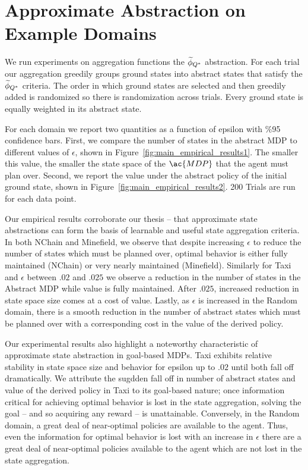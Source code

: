 \section{Approximate Abstraction on Example Domains}
We run experiments on aggregation functions the $\widetilde \phi_{Q^*}$ abstraction. For each trial our aggregation greedily groups ground states into abstract states that satisfy the $\widetilde \phi_{Q^*}$ criteria. The order in which ground states are selected and then greedily added is randomized so there is randomization across trials. Every ground state is equally weighted in its abstract state.

For each domain we report two quantities as a function of epsilon with \%95 confidence bars. First, we compare the number of states in the abstract \ac{MDP} to different values of $\epsilon$, shown in Figure~\ref{fig:main_empirical_results1}. The smaller this value, the smaller the state space of the $\ac{MDP}$ that the agent must plan over. Second, we report the value under the abstract policy of the initial ground state, shown in Figure~\ref{fig:main_empirical_results2}. 200 Trials are run for each data point.

Our empirical results corroborate our thesis -- that approximate state abstractions can form the basis of learnable and useful state aggregation criteria. In both NChain and Minefield, we observe that despite increasing $\epsilon$ to reduce the number of states which must be planned over, optimal behavior is either fully maintained (NChain) or very nearly maintained (Minefield). Similarly for Taxi and $\epsilon$ between $.02$ and $.025$ we observe a reduction in the number of states in the Abstract MDP while value is fully maintained. After $.025$, increased reduction in state space size comes at a cost of value. Lastly, as $\epsilon$ is increased in the Random domain, there is a smooth reduction in the number of abstract states which must be planned over with a corresponding cost in the value of the derived policy.

Our experimental results also highlight a noteworthy characteristic of approximate state abstraction in goal-based \acp{MDP}. Taxi exhibits relative stability in state space size and behavior for epsilon up to $.02$ until both fall off dramatically. We attribute the sugdden fall off in number of abstract states and value of the derived policy in Taxi to its goal-based nature; once information critical for achieving optimal behavior is lost in the state aggregation, solving the goal -- and so acquiring any reward -- is unattainable. Conversely, in the Random domain, a great deal of near-optimal policies are available to the agent. Thus, even the information for optimal behavior is lost with an increase in $\epsilon$ there are a great deal of near-optimal policies available to the agent which are not lost in the state aggregation.

